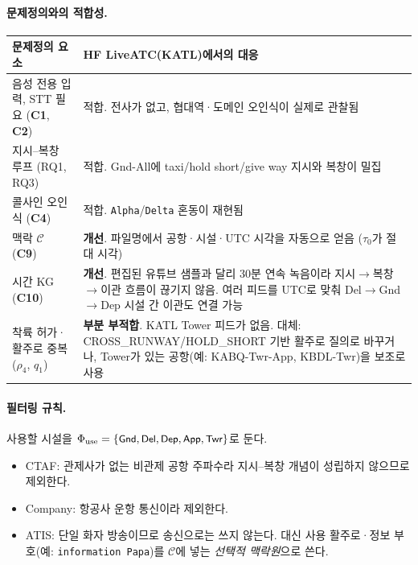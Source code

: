 \documentclass[10pt,a4paper]{article}
\newcommand{\Ctx}{\mathcal{C}}
\newcommand{\cmd}[1]{\textsf{\small #1}}
\newcommand{\ch}[1]{\textbf{\textcolor{red!60!black}{#1}}}
\begin{document}
\paragraph{문제정의와의 적합성.}
\begin{center}\small
\begin{tabularx}{\textwidth}{@{}>{\raggedright\arraybackslash}p{4.2cm}>{\raggedright\arraybackslash}X@{}}
\toprule
문제정의 요소 & HF LiveATC(KATL)에서의 대응\\\midrule
음성 전용 입력, STT 필요 (\ch{C1}, \ch{C2}) & 적합. 전사가 없고, 협대역·도메인 오인식이 실제로 관찰됨\\
지시–복창 루프 (RQ1, RQ3) & 적합. \cmd{Gnd-All}에 taxi/hold short/give way 지시와 복창이 밀집\\
콜사인 오인식 (\ch{C4}) & 적합. \texttt{Alpha}/\texttt{Delta} 혼동이 재현됨\\
맥락 $\Ctx$ (\ch{C9}) & \textbf{개선}. 파일명에서 공항·시설·UTC 시각을 자동으로 얻음 ($\tau_0$가 절대 시각)\\
시간 KG (\ch{C10}) & \textbf{개선}. 편집된 유튜브 샘플과 달리 30분 연속 녹음이라 지시$\to$복창$\to$이관 흐름이 끊기지 않음. 여러 피드를 UTC로 맞춰 \cmd{Del}$\to$\cmd{Gnd}$\to$\cmd{Dep} 시설 간 이관도 연결 가능\\
착륙 허가·활주로 중복 ($\rho_4$, $q_1$) & \textbf{부분 부적합}. KATL Tower 피드가 없음. 대체: \cmd{CROSS\_RUNWAY}/\cmd{HOLD\_SHORT} 기반 활주로 질의로 바꾸거나, Tower가 있는 공항(예: \cmd{KABQ-Twr-App}, \cmd{KBDL-Twr})을 보조로 사용\\
\bottomrule
\end{tabularx}
\end{center}

\paragraph{필터링 규칙.} 사용할 시설을 $\Phi_{\mathrm{use}}=\{\cmd{Gnd},\cmd{Del},\cmd{Dep},\cmd{App},\cmd{Twr}\}$로 둔다.
\begin{itemize}
\item \cmd{CTAF}: 관제사가 없는 비관제 공항 주파수라 지시–복창 개념이 성립하지 않으므로 제외한다.
\item \cmd{Company}: 항공사 운항 통신이라 제외한다.
\item \cmd{ATIS}: 단일 화자 방송이므로 송신으로는 쓰지 않는다. 대신 사용 활주로·정보 부호(예: \texttt{information Papa})를 $\Ctx$에 넣는 \emph{선택적 맥락원}으로 쓴다.
\end{itemize}
\end{document}
